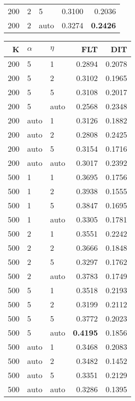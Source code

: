 \begin{table}
\begin{spacing}{1.2}
{\begin{tabular}{rll|rr}
 200 &     2 &     5 &           0.3100 &       0.2036 \\
 200 &     2 &  auto &           0.3274 & {\bf 0.2426} \\
\bottomrule
\end{tabular}
} \hfill \parbox{.45\linewidth}{\centering \begin{tabular}{rll|rr}
\toprule
   K & $\alpha$ &   $\eta$ & FLT & DIT \\
\midrule
 200 &     5 &     1 &           0.2894 & 0.2078 \\
 200 &     5 &     2 &           0.3102 & 0.1965 \\
 200 &     5 &     5 &           0.3108 & 0.2017 \\
 200 &     5 &  auto &           0.2568 & 0.2348 \\
 200 &  auto &     1 &           0.3126 & 0.1882 \\
 200 &  auto &     2 &           0.2808 & 0.2425 \\
 200 &  auto &     5 &           0.3154 & 0.1716 \\
 200 &  auto &  auto &           0.3017 & 0.2392 \\
 500 &     1 &     1 &           0.3695 & 0.1756 \\
 500 &     1 &     2 &           0.3938 & 0.1555 \\
 500 &     1 &     5 &           0.3847 & 0.1695 \\
 500 &     1 &  auto &           0.3305 & 0.1781 \\
 500 &     2 &     1 &           0.3551 & 0.2242 \\
 500 &     2 &     2 &           0.3666 & 0.1848 \\
 500 &     2 &     5 &           0.3297 & 0.1762 \\
 500 &     2 &  auto &           0.3783 & 0.1749 \\
 500 &     5 &     1 &           0.3518 & 0.2193 \\
 500 &     5 &     2 &           0.3199 & 0.2112 \\
 500 &     5 &     5 &           0.3772 & 0.2023 \\
 500 &     5 &  auto &     {\bf 0.4195} & 0.1856 \\
 500 &  auto &     1 &           0.3468 & 0.2083 \\
 500 &  auto &     2 &           0.3482 & 0.1452 \\
 500 &  auto &     5 &           0.3351 & 0.2129 \\
 500 &  auto &  auto &           0.3286 & 0.1395 \\
\bottomrule
\end{tabular}
}
\end{spacing}
\end{table}
